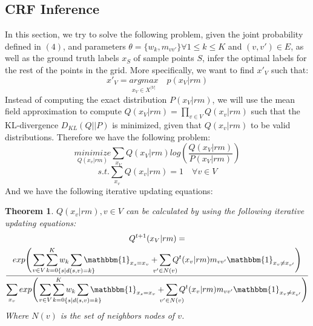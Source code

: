 \documentclass[conference]{IEEEtran}
\begin{document}
\subsection{CRF Inference} 
In this section, we try to solve the following problem, given the joint probability defined in $(4)$, and parameters  $\theta=\{w_{k},m_{vv'}\} \forall 1\leq k\leq K$ and $(v,v')\in E$, as well as the ground truth labels $x_{S}$ of sample points $S$, infer the optimal labels for the rest of the points in the grid. More specifically, we want to find $x'_{V}$ such that: 
\begin{equation}
x'_{V} = \underset{x_{V}\in X^{|V|}} {argmax}  \quad p(x_{V}|rm)
\end{equation}
Instead of computing the exact distribution $P(x_{V}|rm)$, we will use the mean field approximation to compute $Q(x_{V}|rm) = \prod_{v\in V} Q(x_{v}|rm)$ such that the KL-divergence $D_{KL}(Q||P)$ is minimized, given that $Q(x_{v}|rm)$ to be valid distributions. Therefore we have the following problem: 
\begin{equation}
\underset{Q(x_{v}|rm)}{minimize} \sum_{x_{V}} Q(x_{V}|rm)log(\frac{Q(x_{V}|rm)}{P(x_{V}|rm)})
\end{equation}
\begin{equation}
 s.t.  \sum_{x_{v}} Q(x_{v}|rm)=1 \quad \forall v\in V
\end{equation}
And we have the following iterative updating equations:
\newtheorem{mydef1}{Theorem}
\begin{mydef1}
    $Q(x_{v}|rm), v\in V$ can be calculated by using the following iterative updating equations: 
    \begin{multline}
    Q^{t+1}(x_{V}|rm) =\\
     \frac{exp \Bigg( \smashoperator{\sum_{\substack{v\in V}}}\sum_{k=0}^{K}w_{k} \smashoperator{\sum_{\substack{\{s|d(s,v)=k\}}}} \mathbbm{1}_{x_{s}=x_{v}}+ \smashoperator{\sum_{v'\in N(v)}}Q^{t}(x_{v}|rm)m_{vv'} \mathbbm{1}_{x_{v}\neq x_{v'}}\Bigg)}{\smashoperator{\sum_{x_{v}}} exp \Bigg(\smashoperator{\sum_{\substack{v\in V}}}\sum_{k=0}^{K}w_{k} \smashoperator{\sum_{\substack{\{s|d(s,v)=k\}}}} \mathbbm{1}_{x_{s}=x_{v}}+ \smashoperator{\sum_{v'\in N(v)}}Q^{t}(x_{v}|rm)m_{vv'} \mathbbm{1}_{x_{v}\neq x_{v'}}\Bigg)} 
    \end{multline}
    Where $N(v)$ is the set of neighbors nodes of $v$.
\end{mydef1}
\end{document}
